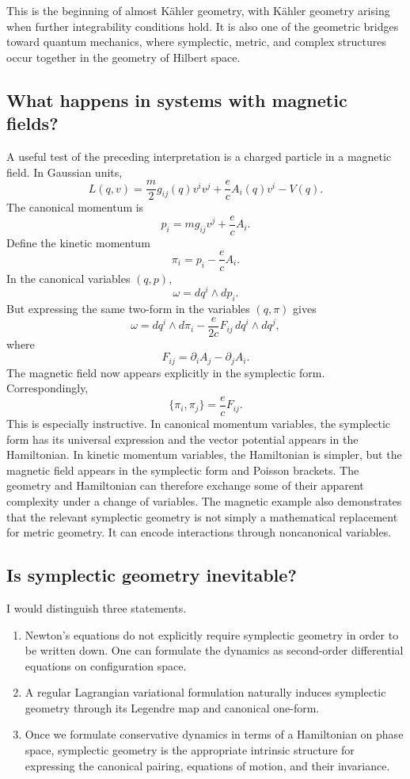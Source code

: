 This is the beginning of almost Kähler geometry, with Kähler geometry arising
when further integrability conditions hold.
It is also one of the geometric bridges toward quantum mechanics, where
symplectic, metric, and complex structures occur together in the geometry of
Hilbert space.

\subsection{ What happens in systems with magnetic fields?}
A useful test of the preceding interpretation is a charged particle in a
magnetic field.
In Gaussian units,
\[
L(q,v)=
\frac m2g_{ij}(q)v^iv^j
+\frac ecA_i(q)v^i-V(q).
\]
The canonical momentum is
\[
p_i=mg_{ij}v^j+\frac ecA_i.
\]
Define the kinetic momentum
\[
\pi_i=p_i-\frac ecA_i.
\]
In the canonical variables \((q,p)\),
\[
\omega=dq^i\wedge dp_i.
\]
But expressing the same two-form in the variables \((q,\pi)\) gives
\[
\boxed{
\omega
=dq^i\wedge d\pi_i
-\frac e{2c}F_{ij}\,dq^i\wedge dq^j,
}
\]
where
\[
F_{ij}=\partial_iA_j-\partial_jA_i.
\]
The magnetic field now appears explicitly in the symplectic form.
Correspondingly,
\[
\boxed{
\{\pi_i,\pi_j\}=\frac ecF_{ij}.
}
\]
This is especially instructive.
In canonical momentum variables, the symplectic form has its universal
expression and the vector potential appears in the Hamiltonian.
In kinetic momentum variables, the Hamiltonian is simpler, but the magnetic
field appears in the symplectic form and Poisson brackets.
The geometry and Hamiltonian can therefore exchange some of their apparent
complexity under a change of variables.
The magnetic example also demonstrates that the relevant symplectic geometry is
not simply a mathematical replacement for metric geometry. It can encode
interactions through noncanonical variables.

\subsection{Is symplectic geometry inevitable?}
I would distinguish three statements.
\begin{enumerate}
   \item Newton's equations do not explicitly require symplectic geometry in
       order to be written down. One can formulate the dynamics as second-order
        differential equations on configuration space.
   \item A regular Lagrangian variational formulation naturally induces
       symplectic geometry through its Legendre map and canonical one-form.
   \item Once we formulate conservative dynamics in terms of a Hamiltonian on
       phase space, symplectic geometry is the appropriate intrinsic structure
        for expressing the canonical pairing, equations of motion, and their
        invariance.
\end{enumerate}

